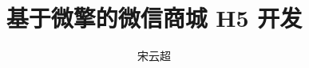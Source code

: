 \documentclass[master]{thesis-uestc}
\title{基于微擎的微信商城 H5 开发}
\author{宋云超}
\begin{document}
  \thesistableofcontents%


\end{document}

